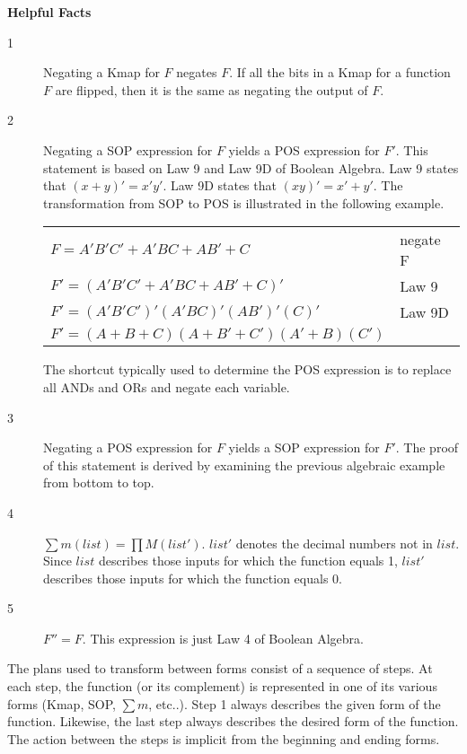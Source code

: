 \textbf{Helpful Facts}

\begin{description}
\item [1]
Negating a Kmap for $F$ negates $F$.  If all the 
bits in a Kmap for a function $F$ are flipped, then it is
the same as negating the output of $F$.

\item [2] 
Negating a SOP expression for $F$ yields a POS 
\label{page:second} expression for $F'$.  This statement is 
based on Law 9 and Law 9D of Boolean Algebra.  Law 9 states that 
$(x+y)' = x'y'$.  Law 9D states that $(xy)' = x'+y'$.
The transformation from SOP to POS is illustrated
in the following example.

\begin{tabular}[ht]{ll}
$F  = A'B'C' + A'BC + AB' + C$      & negate F \\
$F' = (A'B'C' + A'BC + AB' + C)'$   & Law 9 \\
$F' = (A'B'C')'(A'BC)'(AB')'(C)'$   & Law 9D \\
$F' = (A+B+C)(A+B'+C')(A'+B)(C')$  \\
\end{tabular}

The shortcut typically used to determine the POS expression
is to replace all ANDs and ORs and negate each variable. 

\item [3] 
Negating a POS expression for $F$ yields a SOP 
expression for $F'$.  The proof of this statement is
derived by examining the previous algebraic example from
bottom to top.

\item [4] 
$\sum m(list) = \prod M(list')$.  $list'$ 
denotes the decimal numbers not in $list$.  Since $list$ 
describes those inputs for which the function equals 1, 
$list'$ describes those inputs for which the function 
equals 0. 

\item [5] $F'' = F$.  
This expression is just Law 4 of Boolean Algebra.
\end{description}

The plans used to transform between forms consist 
of a sequence of steps.  At each step, the function 
(or its complement) is represented in one
of its various forms (Kmap, SOP, $\sum m$, etc..). 
Step 1 always describes the given form of the function.  
Likewise, the last step always describes the desired form
of the function.  The action between the steps is implicit
from the beginning and ending forms.  

